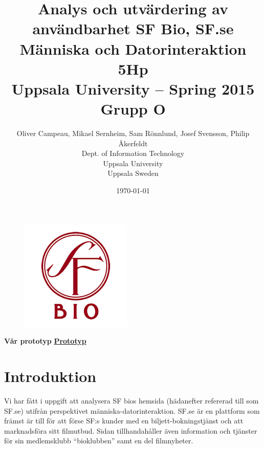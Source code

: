 \documentclass[swedish,a4paper,11pt]{article}
\begin{document}
\begin{titlepage}
\title{\textbf{Analys och utvärdering av användbarhet 
SF Bio, SF.se \\
    Människa och Datorinteraktion 5Hp \\ Uppsala University -- Spring 2015 \\
    Grupp O
      }}

\author{
Oliver Campeau, Mikael Sernheim, Sam Rönnlund, Josef Svensson, Philip Åkerfeldt \\
\textup{Dept. of Information Technology}\\
\textup{Uppsala University}\\
\textup{Uppsala Sweden}\\
}
\date{\today}

\end{titlepage}

\maketitle

\begin{figure}[hb]
\centering
\includegraphics[scale=1]{SFBioLogo.png} 
\end{figure}

\newpage
\tableofcontents 

											
\hfill \break
\break										
\textbf{Vår prototyp} \hfill \textbf{\href{http://user.it.uu.se/~mise2899/home.html}{Prototyp}}
\pagebreak


\section{Introduktion}

Vi har fått i uppgift att analysera SF bios hemsida (hädanefter refererad till som SF.se) utifrån perspektivet människa-datorinteraktion. SF.se är en plattform som främst är till för att förse SF:s kunder med en biljett-bokningstjänst och att marknadsföra sitt filmutbud. Sidan tillhandahåller även information och tjänster för sin medlemsklubb “bioklubben” samt en del filmnyheter. 
 
\end{document}
